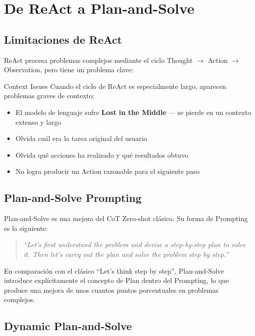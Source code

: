 \section{De ReAct a Plan-and-Solve}

\subsection{Limitaciones de ReAct}

ReAct procesa problemas complejos mediante el ciclo Thought $\rightarrow$ Action $\rightarrow$ Observation, pero tiene un problema clave:

\begin{warningbox}{Context Issues}
Cuando el ciclo de ReAct es especialmente largo, aparecen problemas graves de contexto:
\begin{itemize}
    \item El modelo de lenguaje sufre \textbf{Lost in the Middle} — se pierde en un contexto extenso y largo
    \item Olvida cuál era la tarea original del usuario
    \item Olvida qué acciones ha realizado y qué resultados obtuvo
    \item No logra producir un Action razonable para el siguiente paso
\end{itemize}
\end{warningbox}

\subsection{Plan-and-Solve Prompting}

Plan-and-Solve es una mejora del CoT Zero-shot clásico. Su forma de Prompting es la siguiente:

\begin{quote}
\textit{``Let's first understand the problem and devise a step-by-step plan to solve it. Then let's carry out the plan and solve the problem step by step.''}
\end{quote}

En comparación con el clásico ``Let's think step by step'', Plan-and-Solve introduce explícitamente el concepto de Plan dentro del Prompting, lo que produce una mejora de unos cuantos puntos porcentuales en problemas complejos.

\subsection{Dynamic Plan-and-Solve}

